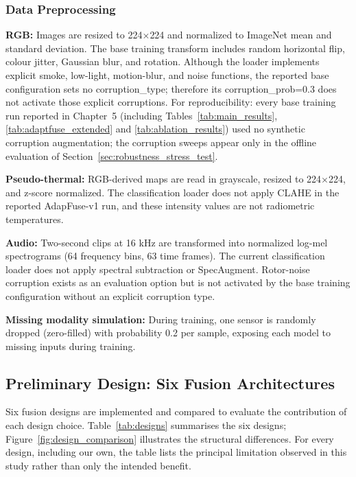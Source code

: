 \documentclass[journal]{IEEEtran}
\begin{document}
\subsubsection{Data Preprocessing}

\textbf{RGB:} Images are resized to 224$\times$224 and normalized to ImageNet mean and standard deviation. The base training transform includes random horizontal flip, colour jitter, Gaussian blur, and rotation. Although the loader implements explicit smoke, low-light, motion-blur, and noise functions, the reported base configuration sets no corruption\_type; therefore its corruption\_prob=0.3 does not activate those explicit corruptions. For reproducibility: every base training run reported in Chapter~5 (including Tables~\ref{tab:main_results}, \ref{tab:adaptfuse_extended} and \ref{tab:ablation_results}) used no synthetic corruption augmentation; the corruption sweeps appear only in the offline evaluation of Section~\ref{sec:robustness_stress_test}.

\textbf{Pseudo-thermal:} RGB-derived maps are read in grayscale, resized to 224$\times$224, and z-score normalized. The classification loader does not apply CLAHE in the reported AdapFuse-v1 run, and these intensity values are not radiometric temperatures.

\textbf{Audio:} Two-second clips at 16 kHz are transformed into normalized log-mel spectrograms (64 frequency bins, 63 time frames). The current classification loader does not apply spectral subtraction or SpecAugment. Rotor-noise corruption exists as an evaluation option but is not activated by the base training configuration without an explicit corruption type.

\textbf{Missing modality simulation:} During training, one sensor is randomly dropped (zero-filled) with probability 0.2 per sample, exposing each model to missing inputs during training.

\subsection{Preliminary Design: Six Fusion Architectures}

Six fusion designs are implemented and compared to evaluate the contribution of each design choice. Table~\ref{tab:designs} summarises the six designs; Figure~\ref{fig:design_comparison} illustrates the structural differences. For every design, including our own, the table lists the principal limitation observed in this study rather than only the intended benefit.
\end{document}
